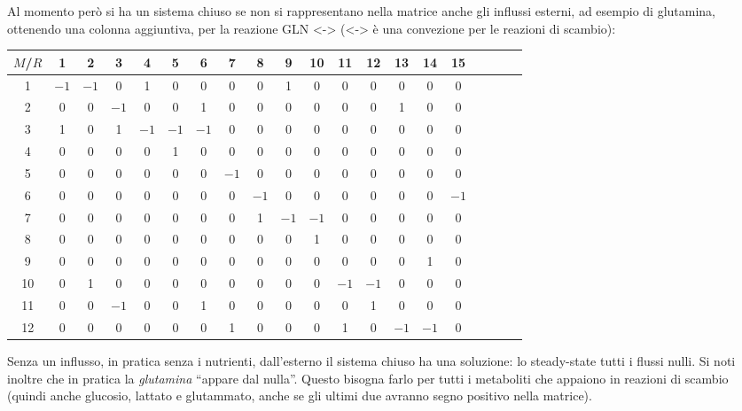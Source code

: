 \documentclass[a4paper,12pt, oneside]{book}
\begin{document}
Al momento però si ha un sistema chiuso se non si rappresentano nella matrice
anche gli influssi esterni, ad esempio di glutamina, ottenendo una colonna
aggiuntiva, per la reazione GLN <-> (<-> è una convezione per le reazioni di
scambio):  
\begin{table}[H]
  \scriptsize
  \centering
  \begin{tabular}{c|c|c|c|c|c|c|c|c|c|c|c|c|c|c|c|c|c|c||c} 
    $M$/$R$& 1 & 2 & 3 & 4 & 5 & 6 & 7 & 8 & 9 & 10 & 11 & 12 & 13 & 14 & 15\\
    \hline 1 & $-1$ & $-1$ & 0 & 1 & 0 & 0 & 0 & 0 & 1 & 0 & 0 & 0 & 0 & 0 & 0
    \\ 
    \hline 2 & 0 & 0 & $-1$ & 0 & 0 & 1 & 0 & 0 & 0 & 0 & 0 & 0 & 1 & 0 & 0 \\
    \hline 3 & 1 & 0 & 1 & $-1$ & $-1$ & $-1$ & 0 & 0 & 0 & 0 & 0 & 0 & 0 & 0
                                                                        & 0 \\  
    \hline 4 & 0 & 0 & 0 & 0 & 1 & 0 & 0 & 0 & 0 & 0 & 0 & 0 & 0 & 0 & 0 \\
    \hline 5 & 0 & 0 & 0 & 0 & 0 & 0 & $-1$ & 0 & 0 & 0 & 0 & 0 & 0 & 0& 0  \\
    \hline 6 & 0 & 0 & 0 & 0 & 0 & 0 & 0 & $-1$ & 0 & 0 & 0 & 0 & 0 & 0 & $-1$
    \\ 
    \hline 7 & 0 & 0 & 0 & 0 & 0 & 0 & 0 & 1 & $-1$ & $-1$ & 0 & 0 & 0 & 0& 0
    \\ 
    \hline 8 & 0 & 0 & 0 & 0 & 0 & 0 & 0 & 0 & 0 & 1 & 0 & 0 & 0 & 0 & 0 \\
    \hline 9 & 0 & 0 & 0 & 0 & 0 & 0 & 0 & 0 & 0 & 0 & 0 & 0 & 0 & 1 & 0 \\
    \hline 10 & 0 & 1 & 0 & 0 & 0 & 0 & 0 & 0 & 0 & 0 & $-1$ & $-1$ & 0 & 0 & 0
    \\ 
    \hline 11 & 0 & 0 & $-1$ & 0 & 0 & 1 & 0 & 0 & 0 & 0 & 0 & 1 & 0 & 0 & 0 \\
    \hline 12 & 0 & 0 & 0 & 0 & 0 & 0 & 1 & 0 & 0 & 0 & 1 & 0 & $-1$ & $-1$ & 0
    \\ 
  \end{tabular}
\end{table}
Senza un influsso, in pratica senza i nutrienti, dall'esterno il sistema chiuso
ha una soluzione: lo steady-state tutti i flussi nulli. Si noti inoltre che in
pratica la \textit{glutamina} ``appare dal nulla''. Questo bisogna farlo per
tutti i metaboliti che appaiono in reazioni di scambio (quindi anche glucosio,
lattato e glutammato, anche se gli ultimi due avranno segno positivo nella
matrice).\\
\end{document}
